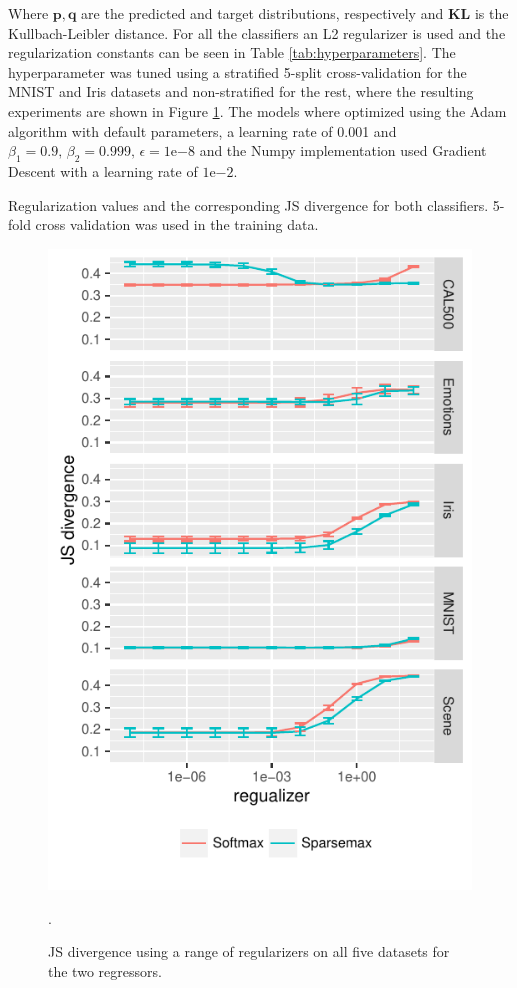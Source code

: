 Where $\mathbf{p}, \mathbf{q}$ are the predicted and target distributions, respectively and $\mathbf{KL}$ is the Kullbach-Leibler distance. For all the classifiers an L2 regularizer is used and the regularization constants can be seen in Table \ref{tab:hyperparameters}. The hyperparameter was tuned using a stratified 5-split cross-validation for the MNIST and Iris datasets and non-stratified for the rest, where the resulting experiments are shown in Figure \ref{fig:hyperparameters}. The models where optimized using the Adam algorithm with default parameters, a learning rate of 0.001 and $\beta_1=0.9, \, \beta_2 = 0.999, \, \epsilon = 1\mathrm{e}{-8}$ and the Numpy implementation used Gradient Descent with a learning rate of $1\mathrm{e}{-2}$.

\begin{table}[H]
\centering

\caption{Regularization values and the corresponding JS divergence for both classifiers. 5-fold cross validation was used in the training data.}
\label{tab:hyperparameters}
\end{table}
\begin{figure}[H]
	\centering
	\includegraphics[scale=1]{figures/hyperparameter.pdf}
\caption{JS divergence using a range of regularizers on all five datasets for the two regressors.}
\label{fig:hyperparameters}.
\end{figure}

